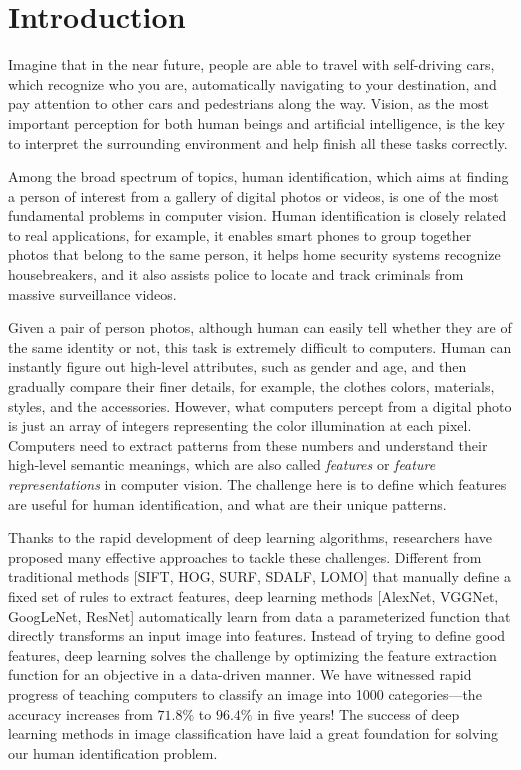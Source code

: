 \chapter{Introduction}
\label{ch:introduction}

Imagine that in the near future, people are able to travel with self-driving cars, which recognize who you are, automatically navigating to your destination, and pay attention to other cars and pedestrians along the way. Vision, as the most important perception for both human beings and artificial intelligence, is the key to interpret the surrounding environment and help finish all these tasks correctly.

Among the broad spectrum of topics, human identification, which aims at finding a person of interest from a gallery of digital photos or videos, is one of the most fundamental problems in computer vision. Human identification is closely related to real applications, for example, it enables smart phones to group together photos that belong to the same person, it helps home security systems recognize housebreakers, and it also assists police to locate and track criminals from massive surveillance videos.

Given a pair of person photos, although human can easily tell whether they are of the same identity or not, this task is extremely difficult to computers. Human can instantly figure out high-level attributes, such as gender and age, and then gradually compare their finer details, for example, the clothes colors, materials, styles, and the accessories. However, what computers percept from a digital photo is just an array of integers representing the color illumination at each pixel. Computers need to extract patterns from these numbers and understand their high-level semantic meanings, which are also called \emph{features} or \emph{feature representations} in computer vision. The challenge here is to define which features are useful for human identification, and what are their unique patterns.

Thanks to the rapid development of deep learning algorithms, researchers have proposed many effective approaches to tackle these challenges. Different from traditional methods [SIFT, HOG, SURF, SDALF, LOMO] that manually define a fixed set of rules to extract features, deep learning methods [AlexNet, VGGNet, GoogLeNet, ResNet] automatically learn from data a parameterized function that directly transforms an input image into features. Instead of trying to define good features, deep learning solves the challenge by optimizing the feature extraction function for an objective in a data-driven manner. We have witnessed rapid progress of teaching computers to classify an image into 1000 categories---the accuracy increases from $71.8\%$ to $96.4\%$ in five years! The success of deep learning methods in image classification have laid a great foundation for solving our human identification problem.

